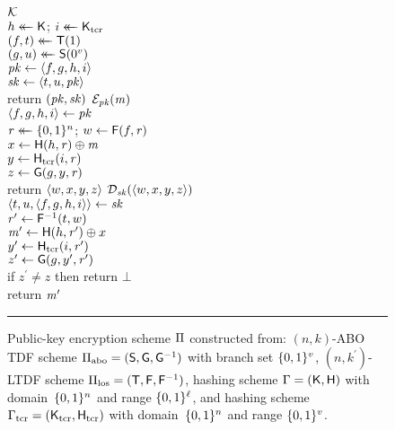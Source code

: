 \begin{figure}[t]
  {
    \underline{$\mathcal{K}$}\\[2pt]
      $h \mathrel{\leftarrow\mkern-14mu\leftarrow} \mathsf{K}$;
      $i \getsr \hashgen_\tcr$\\
      $(f, t) \mathrel{\leftarrow\mkern-14mu\leftarrow} \mathsf{T}(1)$\\
      $(g, u) \mathrel{\leftarrow\mkern-14mu\leftarrow} \mathsf{S}(0^v)$\\
      $\mathit{pk} \gets \langle f, g, h, i \rangle$\\
      $\mathit{sk} \gets \langle t, u, \mathit{pk} \rangle$\\
      return $(\mathit{pk}, \mathit{sk})$
  }
  {
    \underline{$\mathcal{E}_{\mathit{pk}}(\mathit{m})$}\\[2pt]
      $\langle f, g, h, i \rangle \gets \mathit{pk}$\\
      $\mathit{r} \mathrel{\leftarrow\mkern-14mu\leftarrow} \{0,1\}^n$;
      $w \gets \mathsf{F}(f,\mathit{r})$\\
      $x \gets \mathsf{H}(h,\mathit{r}) \oplus \mathit{m}$\\
      $y \gets \hashf_\tcr(i,\coins)$\\
      $z \gets \mathsf{G}(g, y, \mathit{r})$\\
      return $\langle w,x,y,z \rangle$
  }
  {
    \underline{$\mathcal{D}_{\mathit{sk}}(\langle w,x,y,z \rangle)$}\\[2pt]
      $\langle t, u, \langle f, g, h, i \rangle \rangle \gets \mathit{sk}$\\
      $\mathit{r}^\prime \gets \mathsf{F}^{-1}(t, w)$\\
      $\mathit{m}^\prime \gets \mathsf{H}(h,\mathit{r}^\prime) \oplus x$\\
      $y^\prime \gets \hashf_\tcr(i,\coins^\prime)$\\
      $z^\prime \gets \mathsf{G}(g,y^\prime,\mathit{r}^\prime)$\\
      if $z^\prime \ne z$ then
        return $\bot$\\
      return $\mathit{m}^\prime$
  }
  \caption{Public-key encryption scheme $\mathrm{\Pi}$ constructed from:
  $(n,k)$-ABO TDF scheme $\tdfscheme_\abo = (\abogen,\abof,\abofinv)$ with branch set $\{0,1\}^v$,
  $(n,k^\prime)$-LTDF scheme $\tdfscheme_\los = (\losgen,\losf,\losfinv)$,
  hashing scheme $\mathrm{\Gamma} = (\mathsf{K},\mathsf{H})$ with domain~$\{0,1\}^n$ and range
  $\{0,1\}^\ell$, and
  hashing scheme $\hashscheme_\tcr = (\hashgen_\tcr,\hashf_\tcr)$ with domain~$\{0,1\}^n$ and range
  $\{0,1\}^v$.
  }
  \label{fig-proto}
  \vspace{6pt}
  \hrule
\end{figure}
\fi

